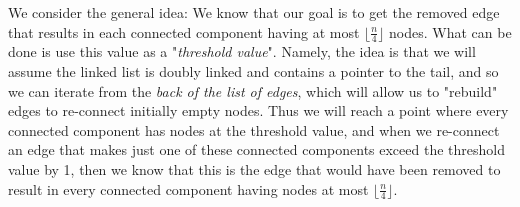 \documentclass[11pt]{article}
\begin{document}
\begin{solution}
  We consider the general idea: We know that our goal is to get the removed edge that results in each connected component having at most $\lfloor \frac{n}{4} \rfloor$ nodes. What can be done is use this value as a "\textit{threshold value}". Namely, the idea is that we will assume the linked list is doubly linked and contains a pointer to the tail, and so we can iterate from the \textit{back of the list of edges}, which will allow us to "rebuild" edges to re-connect initially empty nodes. Thus we will reach a point where every connected component has nodes at the threshold value, and when we re-connect an edge that makes just one of these connected components exceed the threshold value by 1, then we know that this is the edge that would have been removed to result in every connected component having nodes at most $\lfloor \frac{n}{4} \rfloor$.


\end{solution}
\end{document}

